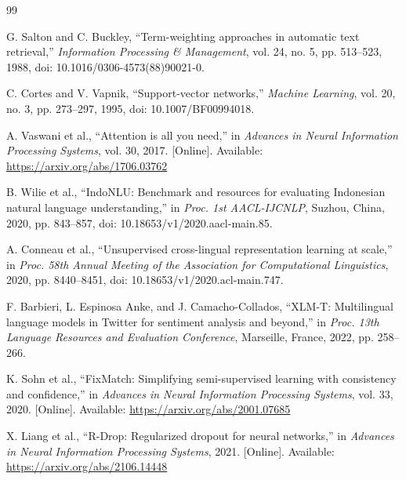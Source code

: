 \begin{thebibliography}{99}

G. Salton and C. Buckley, ``Term-weighting approaches in automatic text retrieval,'' \textit{Information Processing \& Management}, vol. 24, no. 5, pp. 513--523, 1988, doi: 10.1016/0306-4573(88)90021-0.

C. Cortes and V. Vapnik, ``Support-vector networks,'' \textit{Machine Learning}, vol. 20, no. 3, pp. 273--297, 1995, doi: 10.1007/BF00994018.

A. Vaswani et al., ``Attention is all you need,'' in \textit{Advances in Neural Information Processing Systems}, vol. 30, 2017. [Online]. Available: \url{https://arxiv.org/abs/1706.03762}

B. Wilie et al., ``IndoNLU: Benchmark and resources for evaluating Indonesian natural language understanding,'' in \textit{Proc. 1st AACL-IJCNLP}, Suzhou, China, 2020, pp. 843--857, doi: 10.18653/v1/2020.aacl-main.85.

A. Conneau et al., ``Unsupervised cross-lingual representation learning at scale,'' in \textit{Proc. 58th Annual Meeting of the Association for Computational Linguistics}, 2020, pp. 8440--8451, doi: 10.18653/v1/2020.acl-main.747.

F. Barbieri, L. Espinosa Anke, and J. Camacho-Collados, ``XLM-T: Multilingual language models in Twitter for sentiment analysis and beyond,'' in \textit{Proc. 13th Language Resources and Evaluation Conference}, Marseille, France, 2022, pp. 258--266.

K. Sohn et al., ``FixMatch: Simplifying semi-supervised learning with consistency and confidence,'' in \textit{Advances in Neural Information Processing Systems}, vol. 33, 2020. [Online]. Available: \url{https://arxiv.org/abs/2001.07685}

X. Liang et al., ``R-Drop: Regularized dropout for neural networks,'' in \textit{Advances in Neural Information Processing Systems}, 2021. [Online]. Available: \url{https://arxiv.org/abs/2106.14448}

\end{thebibliography}
